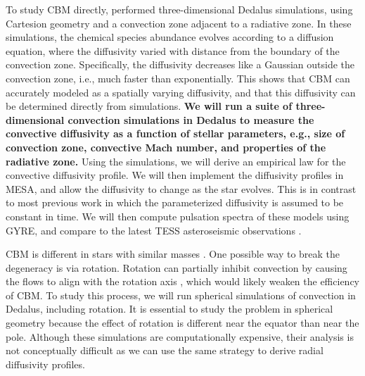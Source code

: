 To study CBM directly, \citet{Lecoanet_2016a} performed three-dimensional Dedalus simulations, using Cartesion geometry and a convection zone adjacent to a radiative zone. In these simulations, the chemical species abundance evolves according to a diffusion equation, where the diffusivity varied with distance from the boundary of the convection zone. Specifically, the diffusivity decreases like a Gaussian outside the convection zone, i.e., much faster than exponentially. This shows that CBM can accurately modeled as a spatially varying diffusivity, and that this diffusivity can be determined directly from simulations. \textbf{We will run a suite of three-dimensional convection simulations in Dedalus to measure the convective diffusivity as a function of stellar parameters, e.g., size of convection zone, convective Mach number, and properties of the radiative zone.} Using the simulations, we will derive an empirical law for the convective diffusivity profile. We will then implement the diffusivity profiles in MESA, and allow the diffusivity to change as the star evolves. {\color{green} This is in contrast to most previous work in which the parameterized diffusivity is assumed to be constant in time.} We will then compute pulsation spectra of these models using GYRE, and compare to the latest TESS asteroseismic observations \citep[similar to][]{moravveji:15,Ghasemi_2016}.

CBM is different in stars with similar masses \citep{Stancliffe_2015}. One possible way to break the degeneracy is via rotation. Rotation can partially inhibit convection by causing the flows to align with the rotation axis \cite[e.g.,][]{Featherstone_2016}, which would likely weaken the efficiency of CBM. To study this process, we will run spherical simulations of convection in Dedalus, including rotation. It is essential to study the problem in spherical geometry because the effect of rotation is different near the equator than near the pole. Although these simulations are computationally expensive, their analysis is not conceptually difficult as we can use the same strategy to derive radial diffusivity profiles.
